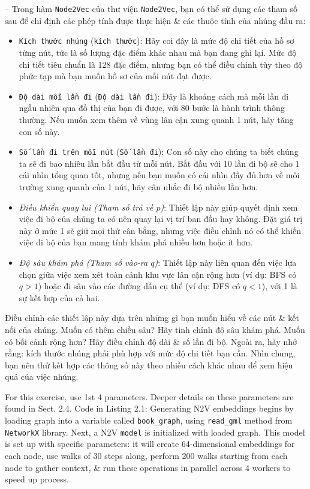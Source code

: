 \documentclass{article}
\begin{document}
\begin{itemize}
\begin{itemize}
\begin{itemize}
           -- Trong hàm {\tt Node2Vec} của thư viện {\tt Node2Vec}, bạn có thể sử dụng các tham số sau để chỉ định các phép tính được thực hiện \& các thuộc tính của nhúng đầu ra:
           \begin{itemize}
               \item {\tt Kích thước nhúng} ({\tt kích thước}): Hãy coi đây là mức độ chi tiết của hồ sơ từng nút, tức là số lượng đặc điểm khác nhau mà bạn đang ghi lại. Mức độ chi tiết tiêu chuẩn là 128 đặc điểm, nhưng bạn có thể điều chỉnh tùy theo độ phức tạp mà bạn muốn hồ sơ của mỗi nút đạt được.
               \item {\tt Độ dài mỗi lần đi} ({\tt Độ dài lần đi}): Đây là khoảng cách mà mỗi lần đi ngẫu nhiên qua đồ thị của bạn đi được, với 80 bước là hành trình thông thường. Nếu muốn xem thêm về vùng lân cận xung quanh 1 nút, hãy tăng con số này.
               \item {\tt Số lần đi trên mỗi nút} ({\tt Số lần đi}): Con số này cho chúng ta biết chúng ta sẽ đi bao nhiêu lần bắt đầu từ mỗi nút. Bắt đầu với 10 lần đi bộ sẽ cho 1 cái nhìn tổng quan tốt, nhưng nếu bạn muốn có cái nhìn đầy đủ hơn về môi trường xung quanh của 1 nút, hãy cân nhắc đi bộ nhiều lần hơn.
               \item {\it Điều khiển quay lui (Tham số trả về $p$)}: Thiết lập này giúp quyết định xem việc đi bộ của chúng ta có nên quay lại vị trí ban đầu hay không. Đặt giá trị này ở mức 1 sẽ giữ mọi thứ cân bằng, nhưng việc điều chỉnh nó có thể khiến việc đi bộ của bạn mang tính khám phá nhiều hơn hoặc ít hơn.
               \item {\it Độ sâu khám phá (Tham số vào-ra $q$)}: Thiết lập này liên quan đến việc lựa chọn giữa việc xem xét toàn cảnh khu vực lân cận rộng hơn (ví dụ: BFS có $q > 1$) hoặc đi sâu vào các đường dẫn cụ thể (ví dụ: DFS có $q < 1$), với 1 là sự kết hợp của cả hai.
           \end{itemize}
           Điều chỉnh các thiết lập này dựa trên những gì bạn muốn hiểu về các nút \& kết nối của chúng. Muốn có thêm chiều sâu? Hãy tinh chỉnh độ sâu khám phá. Muốn có bối cảnh rộng hơn? Hãy điều chỉnh độ dài \& số lần đi bộ. Ngoài ra, hãy nhớ rằng: kích thước nhúng phải phù hợp với mức độ chi tiết bạn cần. Nhìn chung, bạn nên thử kết hợp các thông số này theo nhiều cách khác nhau để xem hiệu quả của việc nhúng.

           For this exercise, use 1st 4 parameters. Deeper details on these parameters are found in Sect. 2.4. Code in {\sf Listing 2.1: Generating N2V embeddings} begins by loading graph into a variable called \verb|book_graph|, using \verb|read_gml| method from {\tt NetworkX} library. Next, a N2V {\tt model} is initialized with loaded graph. This model is set up with specific parameters: it will create 64-dimensional embeddings for each node, use walks of 30 steps along, perform 200 walks starting from each node to gather context, \& run these operations in parallel across 4 workers to speed up process.


\end{itemize}
\end{itemize}
\end{itemize}
\end{document}
